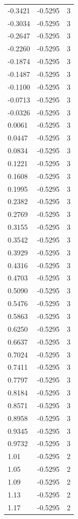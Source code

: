 \begin{longtable}{lrr}
  -0.3421 & -0.5295 & 3 \\
  -0.3034 & -0.5295 & 3 \\
  -0.2647 & -0.5295 & 3 \\
  -0.2260 & -0.5295 & 3 \\
  -0.1874 & -0.5295 & 3 \\
  -0.1487 & -0.5295 & 3 \\
  -0.1100 & -0.5295 & 3 \\
  -0.0713 & -0.5295 & 3 \\
  -0.0326 & -0.5295 & 3 \\
  0.0061 & -0.5295 & 3 \\
  0.0447 & -0.5295 & 3 \\
  0.0834 & -0.5295 & 3 \\
  0.1221 & -0.5295 & 3 \\
  0.1608 & -0.5295 & 3 \\
  0.1995 & -0.5295 & 3 \\
  0.2382 & -0.5295 & 3 \\
  0.2769 & -0.5295 & 3 \\
  0.3155 & -0.5295 & 3 \\
  0.3542 & -0.5295 & 3 \\
  0.3929 & -0.5295 & 3 \\
  0.4316 & -0.5295 & 3 \\
  0.4703 & -0.5295 & 3 \\
  0.5090 & -0.5295 & 3 \\
  0.5476 & -0.5295 & 3 \\
  0.5863 & -0.5295 & 3 \\
  0.6250 & -0.5295 & 3 \\
  0.6637 & -0.5295 & 3 \\
  0.7024 & -0.5295 & 3 \\
  0.7411 & -0.5295 & 3 \\
  0.7797 & -0.5295 & 3 \\
  0.8184 & -0.5295 & 3 \\
  0.8571 & -0.5295 & 3 \\
  0.8958 & -0.5295 & 3 \\
  0.9345 & -0.5295 & 3 \\
  0.9732 & -0.5295 & 3 \\
  1.01 & -0.5295 & 2 \\
  1.05 & -0.5295 & 2 \\
  1.09 & -0.5295 & 2 \\
  1.13 & -0.5295 & 2 \\
  1.17 & -0.5295 & 2 \\

\end{longtable}
